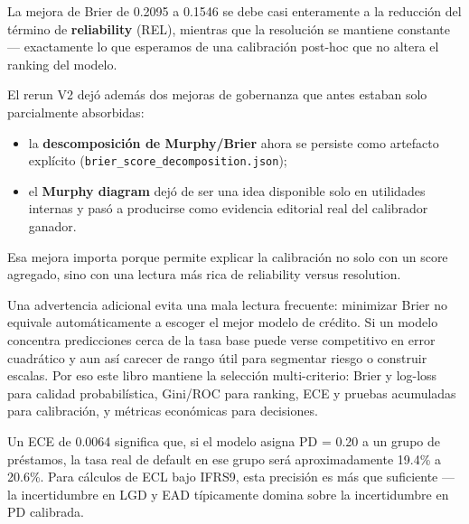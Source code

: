 \documentclass[
  spanish,
  11pt,
  letterpaper,
]{scrbook}
\providecommand{\tightlist}{%
  \setlength{\itemsep}{0pt}\setlength{\parskip}{0pt}}
\theoremstyle{plain}
\theoremstyle{remark}
\begin{document}
La mejora de Brier de 0.2095 a 0.1546 se debe casi enteramente a la
reducción del término de \textbf{reliability} (REL), mientras que la
resolución se mantiene constante --- exactamente lo que esperamos de una
calibración post-hoc que no altera el ranking del modelo.

El rerun V2 dejó además dos mejoras de gobernanza que antes estaban solo
parcialmente absorbidas:

\begin{itemize}
\tightlist
\item
  la \textbf{descomposición de Murphy/Brier} ahora se persiste como
  artefacto explícito (\texttt{brier\_score\_decomposition.json});
\item
  el \textbf{Murphy diagram} dejó de ser una idea disponible solo en
  utilidades internas y pasó a producirse como evidencia editorial real
  del calibrador ganador.
\end{itemize}

Esa mejora importa porque permite explicar la calibración no solo con un
score agregado, sino con una lectura más rica de reliability versus
resolution.

Una advertencia adicional evita una mala lectura frecuente: minimizar
Brier no equivale automáticamente a escoger el mejor modelo de crédito.
Si un modelo concentra predicciones cerca de la tasa base puede verse
competitivo en error cuadrático y aun así carecer de rango útil para
segmentar riesgo o construir escalas. Por eso este libro mantiene la
selección multi-criterio: Brier y log-loss para calidad probabilística,
Gini/ROC para ranking, ECE y pruebas acumuladas para calibración, y
métricas económicas para decisiones.

\begin{tcolorbox}[enhanced jigsaw, arc=.35mm, bottomrule=.15mm, bottomtitle=1mm, breakable, colback=white, colbacktitle=quarto-callout-tip-color!10!white, colframe=quarto-callout-tip-color-frame, coltitle=black, left=2mm, leftrule=.75mm, opacityback=0, opacitybacktitle=0.6, rightrule=.15mm, title=\textcolor{quarto-callout-tip-color}{\faLightbulb}\hspace{0.5em}{Interpretación práctica del ECE}, titlerule=0mm, toprule=.15mm, toptitle=1mm]

Un ECE de 0.0064 significa que, si el modelo asigna PD = 0.20 a un grupo
de préstamos, la tasa real de default en ese grupo será aproximadamente
19.4\% a 20.6\%. Para cálculos de ECL bajo IFRS9, esta precisión es más
que suficiente --- la incertidumbre en LGD y EAD típicamente domina
sobre la incertidumbre en PD calibrada.

\end{tcolorbox}
\end{document}
